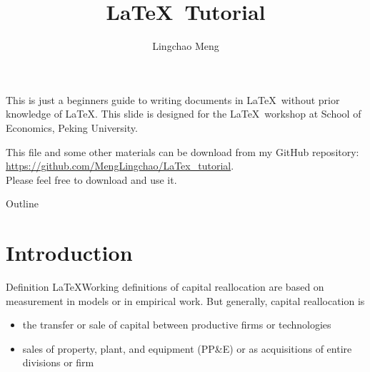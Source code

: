 \documentclass[11pt]{beamer}
\begin{document}
	
	\begin{CJK*}{UTF8}{gkai}
		
	\author[LC Meng]{Lingchao Meng}
	\title[LaTeX Tutorial]{\LaTeX\ Tutorial}
\begin{frame}[plain]
    \maketitle
\end{frame}

\begin{frame}
	This is  just a beginners guide to writing documents in \LaTeX\ without prior knowledge of \LaTeX. This slide is designed for the \LaTeX\ workshop at School of Economics, Peking University.
\end{frame}

\begin{frame}
	This file and some other materials can be download from my GitHub repository: \underline{https://github.com/MengLingchao/LaTex\_tutorial}. \\Please feel free to download and use it.
\end{frame}

\begin{frame}{Outline}
	\tableofcontents
\end{frame}

\section{Introduction}
\begin{frame}
	\sectionpage
\end{frame}

\begin{frame}{Definition}
\LaTeX	Working definitions of capital reallocation are based on measurement in models or in empirical work. But generally, \alert{capital reallocation} is 
	\begin{itemize}
		\item the transfer or sale of capital between productive firms or technologies
		\item sales of property, plant, and equipment (PP\&E) or as acquisitions of entire divisions or firm
	\end{itemize}
\end{frame}



\end{CJK*}
\end{document}
